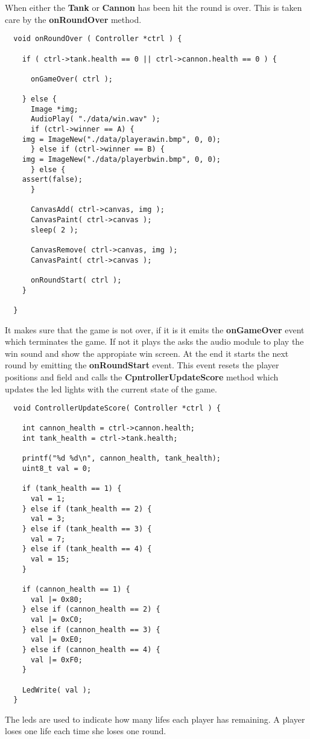 When either the {\bf Tank} or {\bf Cannon} has been hit the round is over. This is
taken care by the {\bf onRoundOver} method.
\begin{lstlisting}
  void onRoundOver ( Controller *ctrl ) {

    if ( ctrl->tank.health == 0 || ctrl->cannon.health == 0 ) {

      onGameOver( ctrl );

    } else {
      Image *img;
      AudioPlay( "./data/win.wav" );
      if (ctrl->winner == A) {
	img = ImageNew("./data/playerawin.bmp", 0, 0);
      } else if (ctrl->winner == B) {
	img = ImageNew("./data/playerbwin.bmp", 0, 0);
      } else {
	assert(false);
      }

      CanvasAdd( ctrl->canvas, img );
      CanvasPaint( ctrl->canvas );
      sleep( 2 );

      CanvasRemove( ctrl->canvas, img );
      CanvasPaint( ctrl->canvas );

      onRoundStart( ctrl );
    }

  }
\end{lstlisting}

It makes sure that the game is not over, if it is it emits the {\bf onGameOver} event which
terminates the game. If not it plays the asks the audio module to play the win sound and show the
appropiate win screen. At the end it starts the next round by emitting the {\bf onRoundStart} event.
This event resets the player positions and field and calls the {\bf CpntrollerUpdateScore} method
which updates the led lights with the current state of the game.
\begin{lstlisting}
  void ControllerUpdateScore( Controller *ctrl ) {

    int cannon_health = ctrl->cannon.health;
    int tank_health = ctrl->tank.health;

    printf("%d %d\n", cannon_health, tank_health);
    uint8_t val = 0;

    if (tank_health == 1) {
      val = 1;
    } else if (tank_health == 2) {
      val = 3;
    } else if (tank_health == 3) {
      val = 7;
    } else if (tank_health == 4) {
      val = 15;
    }

    if (cannon_health == 1) {
      val |= 0x80;
    } else if (cannon_health == 2) {
      val |= 0xC0;
    } else if (cannon_health == 3) {
      val |= 0xE0;
    } else if (cannon_health == 4) {
      val |= 0xF0;
    }

    LedWrite( val );
  }
\end{lstlisting}
The leds are used to indicate how many lifes each player has remaining. A player loses one life each
time she loses one round.

